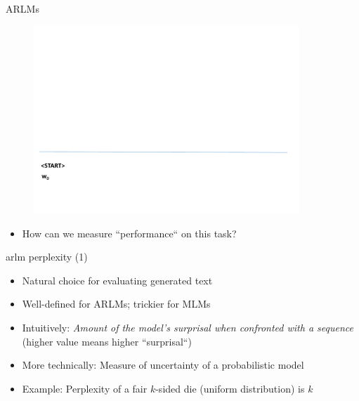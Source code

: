 \begin{frame}{ARLMs}

\vspace{-1cm}

	\begin{figure}
		\centering
		\includegraphics[width=10cm,page=13]{figure/arlm.pdf}
	\end{figure}
	
\begin{itemize}
	\item \ques How can we measure ``performance`` on this task? 
\end{itemize}

\vfill

\end{frame}


\begin{frame}{arlm perplexity (1)}

\vfill

\begin{itemize}
	\item Natural choice for evaluating generated text
	\item Well-defined for ARLMs; trickier for MLMs
	\item Intuitively: \textit{Amount of the model's surprisal when confronted with a sequence} (higher value means higher ``surprisal``)
	\item More technically: Measure of uncertainty of a probabilistic model
	\item Example: Perplexity of a fair $k$-sided die (uniform distribution) is $k$
\end{itemize}

\vfill

\end{frame}

